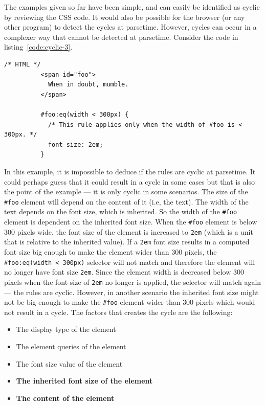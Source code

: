 \documentclass[a4paper,11pt]{kth-mag}
\newcommand{\code}[1]{\texttt{#1}}
\begin{document}
        The examples given so far have been simple, and can easily be identified as cyclic by reviewing the \gls{CSS} code.
        It would also be possible for the browser (or any other program) to detect the cycles at parsetime.
        However, cycles can occur in a complexer way that cannot be detected at parsetime.
        Consider the code in listing~\ref{code:cyclic-3}.
        \begin{lstlisting}[gobble=10,caption={Example of cyclic rules that cannot be detected at parsetime.}, captionpos=b, label={code:cyclic-3}]
          /* HTML */
          <span id="foo">
            When in doubt, mumble.
          </span>

          #foo:eq(width < 300px) {
            /* This rule applies only when the width of #foo is < 300px. */
            font-size: 2em;
          }
        \end{lstlisting}
        In this example, it is impossible to deduce if the rules are cyclic at parsetime.
        It could perhaps guess that it could result in a cycle in some cases but that is also the point of the example --- it is only cyclic in some scenarios.
        The size of the \code{\#foo} element will depend on the content of it (i.e, the text).
        The width of the text depends on the font size, which is inherited.
        So the width of the \code{\#foo} \gls{element} is dependent on the inherited font size.
        When the \code{\#foo} \gls{element} is below 300 pixels wide, the font size of the element is increased to \code{2em} (which is a unit that is relative to the inherited value).
        If a \code{2em} font size results in a computed font size big enough to make the \gls{element} wider than 300 pixels, the \code{\#foo:eq(width < 300px)} selector will not match and therefore the element will no longer have font size \code{2em}.
        Since the element width is decreased below 300 pixels when the font size of \code{2em} no longer is applied, the selector will match again --- the rules are cyclic.
        However, in another scenario the inherited font size might not be big enough to make the \code{\#foo} element wider than 300 pixels which would not result in a cycle.
        The factors that creates the cycle are the following:
        \begin{itemize}
          \item The display type of the \gls{element}
          \item The \gls{element} queries of the \gls{element}
          \item The font size value of the \gls{element}
          \item \textbf{The inherited font size of the \gls{element}}
          \item \textbf{The content of the \gls{element}}
        \end{itemize}
\end{document}
